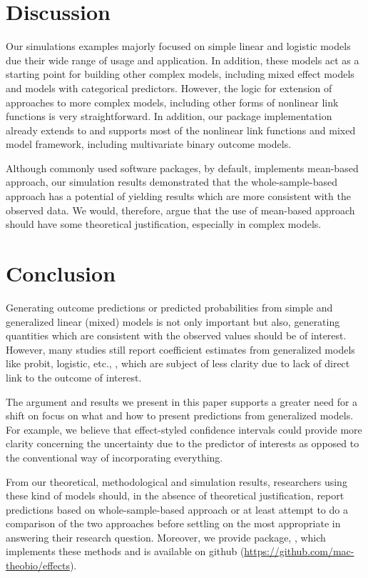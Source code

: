 \section*{Discussion}

Our simulations examples majorly focused on simple linear and logistic models due their wide range of usage and application. In addition, these models act as a starting point for building other complex models, including mixed effect models and models with categorical predictors. However, the logic for extension of approaches to more complex models, including other forms of nonlinear link functions is very straightforward. In addition, our  package implementation already extends to and supports most of the nonlinear link functions and mixed model framework, including multivariate binary outcome models.

Although commonly used  software packages, by default, implements mean-based approach, our simulation results demonstrated that the whole-sample-based approach has a potential of yielding results which are more consistent with the observed data. We would, therefore, argue that the use of mean-based approach should have some theoretical justification, especially in complex models. 

\section*{Conclusion}

Generating outcome predictions or predicted probabilities from simple and generalized linear (mixed) models is not only important but also, generating quantities which are consistent with the observed values should be of interest. However, many studies still report coefficient estimates from generalized models like probit, logistic, etc., \citep{hanmer2013behind}, which are subject of less clarity due to lack of direct link to the outcome of interest.

The argument and results we present in this paper supports a greater need for a shift on focus on what and how to present predictions from generalized models. For example, we believe that effect-styled confidence intervals could provide more clarity concerning the uncertainty due to the predictor of interests as opposed to the conventional way of incorporating everything. 

From our theoretical, methodological and simulation results, researchers using these kind of models should, in the absence of theoretical justification, report predictions based on whole-sample-based approach or at least attempt to do a comparison of the two approaches before settling on the most appropriate in answering their research question. Moreover, we provide  package, , which implements these methods and is available on github (\href{https://github.com/mac-theobio/effects}{https://github.com/mac-theobio/effects}).


